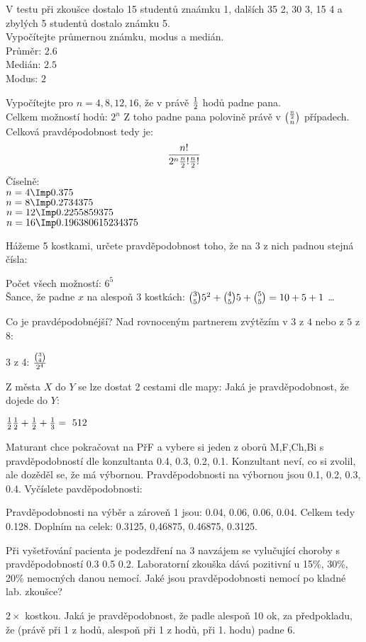 \Pr  V testu při zkoušce dostalo 15 studentů znaámku 1, dalších 35 2, 30 3, 15 4 a zbylých 5 studentů dostalo známku 5.\\
Vypočítejte průmernou známku, modus a medián.\\
Průměr: $2.6$\\
Medián: $2.5$\\
Modus:  $2$

\Pr  Vypočítejte pro $n=4,8,12,16$, že v právě $\frac 1 2$ hodů padne pana.\\
Celkem možností hodů: $2^n$
Z toho padne pana polovině právě v ${\frac n 2\choose n}$ případech.
Celková pravdépodobnost tedy je:
$$\f{n!}{2^n\*\f n 2 !\*\f n 2!}$$
Číselně:\\
$n=4 \Imp 0.375$\\
$n=8 \Imp 0.2734375$\\
$n=12 \Imp 0.2255859375$\\
$n=16 \Imp 0.196380615234375$

\Pr Hážeme 5 kostkami, určete pravděpodobnost toho, že na 3 z nich padnou stejná čísla:

Počet všech možností: $6^5$\\
Šance, že padne $x$ na alespoň 3 kostkách: ${3\choose 5} \* 5^2+ {4\choose 5} \* 5 + {5\choose 5} = 10 + 5 + 1$
\dots

\Pr Co je pravdépodobnéjší? Nad rovnoceným partnerem zvýtězím v $3$ z $4$ nebo z $5$ z 8:

$3$ z 4: $\frac{{3 \choose 4}}{2^4}$

Z města $X$ do $Y$ se lze dostat 2 cestami dle mapy:
Jaká je pravděpodobnost, že dojede do $Y$:

$\f 1 2 \* \f 1 2 + \f 1 2 + \f 1 3 = \ 5 12$

\Pr Maturant chce pokračovat na PřF a vybere si jeden z oborů M,F,Ch,Bi s pravděpodobností dle konzultanta 0.4, 0.3, 0.2, 0.1.
Konzultant neví, co si zvolil, ale dozěděl se, že má výbornou.
Pravděpodobnosti na výbornou jsou 0.1, 0.2, 0.3, 0.4.
Vyčíslete pavděpodobnosti:

Pravděpodobnosti na výběr a zároveň 1 jsou: 0.04, 0.06, 0.06, 0.04.
Celkem tedy 0.128. Doplním na celek: 0.3125, 0,46875, 0.46875, 0.3125.

\Pr  Při vyšetřování pacienta je podezdření na 3 navzájem se vylučující choroby s pravděpodobností 0.3 0.5 0.2. Laboratorní zkouška dává pozitivní u 15\%, 30\%, 20\% nemocných danou nemocí. Jaké jsou pravděpodobnosti nemocí po kladné lab. zkoušce?

\Pr $2\times$ kostkou. Jaká je pravděpodobnost, že padle alespoň 10 ok, za předpokladu, že (právě při 1 z hodů, alespoň při 1 z hodů, při 1. hodu) padne 6.

